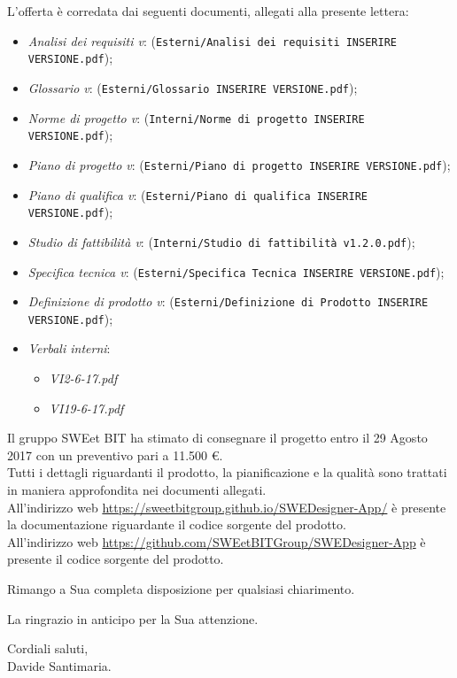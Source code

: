 	L'offerta è corredata dai seguenti documenti, allegati alla presente lettera:
	\begin{itemize}
		\item \emph{Analisi dei requisiti v\VersioneAR{}}: (\verb|Esterni/Analisi dei requisiti INSERIRE VERSIONE.pdf|);
		\item \emph{Glossario v\VersioneG{}}: (\verb|Esterni/Glossario INSERIRE VERSIONE.pdf|);
		\item \emph{Norme di progetto v\VersioneNP{}}: (\verb|Interni/Norme di progetto INSERIRE VERSIONE.pdf|);
		\item \emph{Piano di progetto v\VersionePP{}}: (\verb|Esterni/Piano di progetto INSERIRE VERSIONE.pdf|);
		\item \emph{Piano di qualifica v\VersionePQ{}}: (\verb|Esterni/Piano di qualifica INSERIRE VERSIONE.pdf|);
		\item \emph{Studio di fattibilità v\VersioneSF{}}: (\verb|Interni/Studio di fattibilità v1.2.0.pdf|);
		\item \emph{Specifica tecnica v\VersioneST{}}: (\verb|Esterni/Specifica Tecnica INSERIRE VERSIONE.pdf|);
		\item \emph{Definizione di prodotto v\VersioneDP{}}: (\verb|Esterni/Definizione di Prodotto INSERIRE VERSIONE.pdf|);
		\item \emph{Verbali interni}:
		\begin{itemize}
			\item \emph{VI2-6-17.pdf}
			\item \emph{VI19-6-17.pdf}
		\end{itemize}
	\end{itemize}
	Il gruppo SWEet BIT ha stimato di consegnare il progetto entro il 29 Agosto 2017
	con un preventivo pari a 11.500 \euro .\\
	Tutti i dettagli riguardanti il prodotto, la pianificazione e la qualità sono trattati in maniera approfondita
	nei documenti allegati.\\
	All'indirizzo web \url{https://sweetbitgroup.github.io/SWEDesigner-App/} è presente la documentazione riguardante il codice sorgente del prodotto.\\
	All'indirizzo web \url{https://github.com/SWEetBITGroup/SWEDesigner-App} è presente il codice sorgente del prodotto.\\
	\begin{flushleft}
	\vspace{2cm}
		Rimango a Sua completa disposizione per qualsiasi chiarimento.
	\end{flushleft}
	\begin{flushleft}
		La ringrazio in anticipo per la Sua attenzione.
	\end{flushleft}
	\vspace{5mm}
	\begin{center}
		Cordiali saluti,\\
		\vspace{1cm}Davide Santimaria.
	\end{center}

